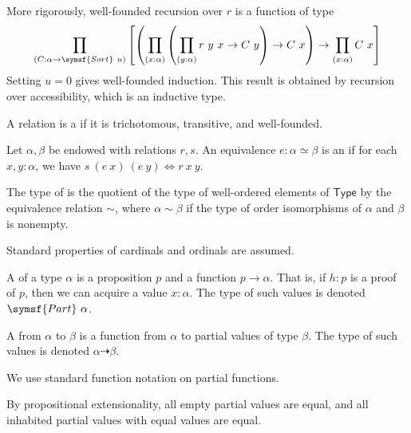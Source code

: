\begin{remark}
    More rigorously, well-founded recursion over \( r \) is a function of type
    \[ \prod_{(C : \alpha \to \symsf{Sort}\ u)} \qty[ \qty(\prod_{(x : \alpha)} \qty(\prod_{(y : \alpha)} r\ y\ x \to C\ y) \to C\ x) \to \prod_{(x : \alpha)} C\ x] \]
    Setting \( u = 0 \) gives well-founded induction.
    This result is obtained by recursion over accessibility, which is an inductive type.
\end{remark}
\begin{definition}
    A relation is a  if it is trichotomous, transitive, and well-founded.
\end{definition}
\begin{definition}
    Let \( \alpha, \beta \) be endowed with relations \( r, s \).
    An equivalence \( e : \alpha \simeq \beta \) is an  if for each \( x, y : \alpha \), we have \( s\ (e\ x)\ (e\ y) \Leftrightarrow r\ x\ y \).
\end{definition}
\begin{definition}
    The type of  is the quotient of the type of well-ordered elements of \( \mathsf{Type} \) by the equivalence relation \( \sim \), where \( \alpha \sim \beta \) if the type of order isomorphisms of \( \alpha \) and \( \beta \) is nonempty.
\end{definition}
Standard properties of cardinals and ordinals are assumed.
\begin{definition}
    A  of a type \( \alpha \) is a proposition \( p \) and a function \( p \to \alpha \).
    That is, if \( h : p \) is a proof of \( p \), then we can acquire a value \( x : \alpha \).
    The type of such values is denoted \( \symsf{Part}\ \alpha \).
\end{definition}
\begin{definition}
    A  from \( \alpha \) to \( \beta \) is a function from \( \alpha \) to partial values of type \( \beta \).
    The type of such values is denoted \( \alpha \rightdasharrow \beta \).
\end{definition}
We use standard function notation on partial functions.
\begin{remark}
    By propositional extensionality, all empty partial values are equal, and all inhabited partial values with equal values are equal.
\end{remark}
